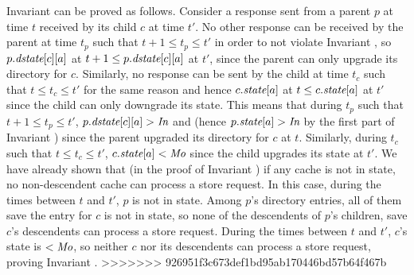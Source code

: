 Invariant  can be proved as follows. Consider a
response sent from a parent $p$ at time $t$ received by its child $c$ at time
$t'$. No other response can be received by the parent at time $t_p$ such that
$t+1 \le t_p \le t'$ in order to not violate Invariant , so
$p.\textit{dstate}[c][a]$ at $t+1 \le p.\textit{dstate}[c][a]$ at $t'$, since the parent can
only upgrade its directory for $c$. Similarly, no response can be sent by the
child at time $t_c$ such that $t \le t_c \le t'$ for the same reason and hence
$c.\textit{state}[a]$ at $t \le c.\textit{state}[a]$ at $t'$ since the child can only downgrade
its state.  This means that during $t_p$ such that $t+1 \le t_p \le t'$,
$p.\textit{dstate}[c][a] > \textit{In}$ and (hence $p.\textit{state}[a] > \textit{In}$ by the first part of
Invariant ) since the parent upgraded its directory
for $c$ at $t$.  Similarly, during $t_c$ such that $t \le t_c \le t'$,
$c.\textit{state}[a] < \textit{Mo}$ since the child upgrades its state at $t'$. We have already
shown that (in the proof of Invariant ) if any cache is
not in \In{} state, no non-descendent cache can process a store request. In
this case, during the times between $t$ and $t'$, $p$ is not in \In{} state.
Among $p$'s directory entries, all of them save the entry for $c$ is not in
\Mo{} state, so none of the descendents of $p$'s children, save $c$'s
descendents can process a store request. During the times between $t$ and $t'$,
$c$'s state is $< \textit{Mo}{}$, so neither $c$ nor its descendents can process a store
request, proving Invariant .
>>>>>>> 926951f3c673def1bd95ab170446bd57b64f467b

